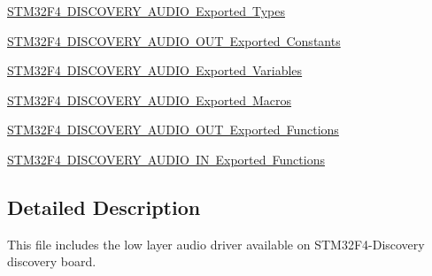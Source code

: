 \begin{DoxyCompactItemize}
\item 
\mbox{\hyperlink{group___s_t_m32_f4___d_i_s_c_o_v_e_r_y___a_u_d_i_o___exported___types}{S\+T\+M32\+F4 D\+I\+S\+C\+O\+V\+E\+R\+Y A\+U\+D\+I\+O Exported Types}}
\item 
\mbox{\hyperlink{group___s_t_m32_f4___d_i_s_c_o_v_e_r_y___a_u_d_i_o___o_u_t___exported___constants}{S\+T\+M32\+F4 D\+I\+S\+C\+O\+V\+E\+R\+Y A\+U\+D\+I\+O O\+U\+T Exported Constants}}
\item 
\mbox{\hyperlink{group___s_t_m32_f4___d_i_s_c_o_v_e_r_y___a_u_d_i_o___exported___variables}{S\+T\+M32\+F4 D\+I\+S\+C\+O\+V\+E\+R\+Y A\+U\+D\+I\+O Exported Variables}}
\item 
\mbox{\hyperlink{group___s_t_m32_f4___d_i_s_c_o_v_e_r_y___a_u_d_i_o___exported___macros}{S\+T\+M32\+F4 D\+I\+S\+C\+O\+V\+E\+R\+Y A\+U\+D\+I\+O Exported Macros}}
\item 
\mbox{\hyperlink{group___s_t_m32_f4___d_i_s_c_o_v_e_r_y___a_u_d_i_o___o_u_t___exported___functions}{S\+T\+M32\+F4 D\+I\+S\+C\+O\+V\+E\+R\+Y A\+U\+D\+I\+O O\+U\+T Exported Functions}}
\item 
\mbox{\hyperlink{group___s_t_m32_f4___d_i_s_c_o_v_e_r_y___a_u_d_i_o___i_n___exported___functions}{S\+T\+M32\+F4 D\+I\+S\+C\+O\+V\+E\+R\+Y A\+U\+D\+I\+O I\+N Exported Functions}}
\end{DoxyCompactItemize}


\subsection{Detailed Description}
This file includes the low layer audio driver available on S\+T\+M32\+F4-\/\+Discovery discovery board. 

